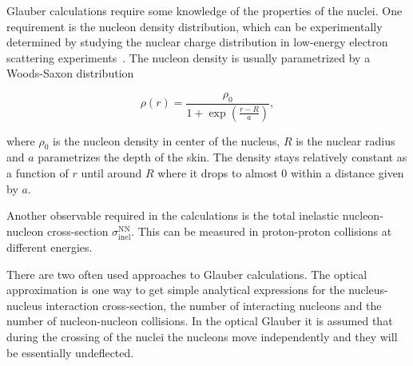 %
%
%
%
%
%
%
%
%
%
%


Glauber calculations require some knowledge of the properties of the nuclei. One requirement is the nucleon density distribution, which can be experimentally determined by studying the nuclear charge distribution in low-energy electron scattering experiments~\cite{Miller:2007ri}.  The nucleon density is usually parametrized by a Woods-Saxon  distribution

%
\begin{equation}
\rho\left(r\right)=\frac{\rho_0}{1+\exp{\left(\frac{r-R}{a}\right)}}
,\end{equation}

\noindent where $\rho_0$ is the nucleon density in center of the nucleus, $R$ is the nuclear radius and $a$ parametrizes the depth of the skin. The density stays relatively constant as a function of $r$ until around $R$ where it drops to almost 0 within a distance given by $a$.

Another observable required in the calculations is the total inelastic nucleon-nucleon cross-section $\sigma\mathrm{^{NN}_{inel}}$.  This can be measured in proton-proton collisions at different energies.

There are two often used approaches to Glauber calculations. The optical approximation is one way to get simple analytical expressions for the nucleus-nucleus interaction cross-section, the number of interacting  nucleons and the number of nucleon-nucleon collisions. In the optical Glauber it is assumed that during the crossing of the nuclei the nucleons move independently and they will be essentially undeflected.  

